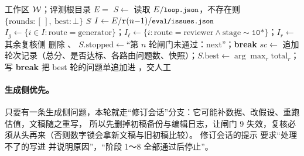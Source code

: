 \begin{algorithm}[t]
\caption{（=$K$，默认 3；=$\delta$，默认 2.0）}
\label{alg:pipe-refine}
\begin{algorithmic}[1]
\Require 工作区 $\mathcal{W}$；评测根目录 $E=$ 
\State $S\gets$ 读取 $E/\texttt{\small loop.json}$，不存在则 $\{\text{rounds}:[\,],\ \text{best}:\bot\}$
 \Return $S$ 
\EndIf
{}
   
  \Else
    \State $I\gets E/\texttt{r}(n{-}1)/\texttt{\small eval/issues.json}$
    \State $I_g\gets\{i\in I: \text{route}=\text{generator}\}$；$I_\ell\gets\{i: \text{route}=\text{reviewer}\wedge\text{stage}\sim\texttt{10*}\}$；$I_r\gets$ 其余复核侧
      \State 删除 、 
      \State {} 
          \EndIf
        \State {} 
      \EndIf
    \Else
        \EndIf
        \EndIf
    \EndIf
  \EndIf
   $S.\text{stopped}\gets$“第 $n$ 轮闸门未通过：next”；\textbf{break} \EndIf
  \State $sc\gets$  
  \State 追加轮次记录（总分、是否达标、各路由问题数、快照）；$S.\text{best}\gets\arg\max_r \text{total}_r$；写 
   \textbf{break} \EndIf
\EndFor
{}  
\EndIf
{} 把 best 轮的问题单追加进 ，交人工 \EndIf
\end{algorithmic}
\end{algorithm}

\paragraph{生成侧优先。}只要有一条生成侧问题，本轮就走“修订会话”分支：它可能补数据、改假设、重跑估值，文稿随之重写，
所以先删掉初稿备份与编辑日志，让闸门 9 失效，复核必须从头再来（否则数字锁会拿新文稿与旧初稿比较）。
修订会话的提示  要求“处理不了的写进  并说明原因”，“阶段 1～8 全部通过后停止”。

